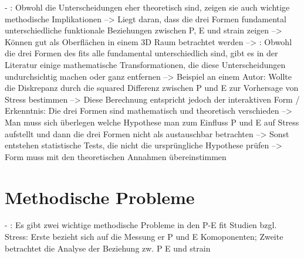 - \cite[S. 5]{edwards:1990}: Obwohl die Unterscheidungen eher theoretisch sind, zeigen sie auch wichtige methodische Implikationen --> Liegt daran, dass die drei Formen fundamental unterschiedliche funktionale Beziehungen zwischen P, E und strain zeigen --> Können gut als Oberflächen in einem 3D Raum betrachtet werden --> \cite[S. 7]{edwards:1990}: Obwohl die drei Formen des fits alle fundamental unterschiedlich sind, gibt es in der Literatur einige mathematische Transformationen, die diese Unterscheidungen undurchsichtig machen oder ganz entfernen --> Beispiel an einem Autor: Wollte die Diskrepanz durch die squared Differenz zwischen P und E zur Vorhersage von Stress bestimmen --> Diese Berechnung entspricht jedoch der interaktiven Form / Erkenntnis: Die drei Formen sind mathematisch und theoretisch verschieden --> Man muss sich überlegen welche Hypothese man zum Einfluss P und E auf Stress aufstellt und dann die drei Formen nicht als austauschbar betrachten --> Sonst entstehen statistische Tests, die nicht die ursprüngliche Hypothese prüfen --> Form muss mit den theoretischen Annahmen übereinstimmen

\section{Methodische Probleme}
\label{ch:notizen:methodischeProbleme}
- \cite[S. 7]{edwards:1990}: Es gibt zwei wichtige methodische Probleme in den P-E fit Studien bzgl. Stress: Erste bezieht sich auf die Messung er P und E Komoponenten; Zweite betrachtet die Analyse der Beziehung zw. P E und strain

